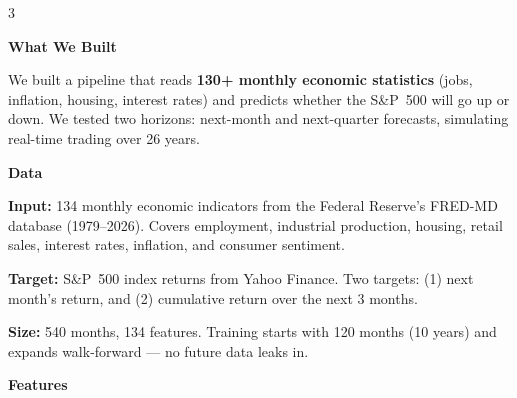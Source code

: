 \documentclass[12pt]{article}
\newcommand{\postersection}[1]{%
  \vspace{0.5em}
  \noindent
  \hspace*{-\leftskip}%
  \colorbox{rhgreen}{\parbox{\dimexpr\linewidth-\rightskip-2\fboxsep\relax}{\textcolor{rhbg}{\textbf{\LARGE #1}}}}\par
  \vspace{0.3em}
}
\begin{document}
\vspace{0.3in}


\begin{multicols}{3}
\setlength{\leftskip}{0.3in}%
\setlength{\rightskip}{0.3in}%

\postersection{What We Built}

\large
We built a pipeline that reads \textbf{130+ monthly economic statistics}
(jobs, inflation, housing, interest rates) and predicts whether the
S\&P~500 will go up or down. We tested two horizons: next-month and
next-quarter forecasts, simulating real-time trading over 26 years.

\postersection{Data}

\large
\textbf{Input:} 134 monthly economic indicators from the Federal Reserve's
FRED-MD database (1979--2026). Covers employment, industrial production,
housing, retail sales, interest rates, inflation, and consumer sentiment.

\textbf{Target:} S\&P~500 index returns from Yahoo Finance. Two targets:
(1) next month's return, and (2) cumulative return over the next 3 months.

\textbf{Size:} 540 months, 134 features. Training starts with 120 months
(10 years) and expands walk-forward --- no future data leaks in.

\postersection{Features}


\end{multicols}
\end{document}
